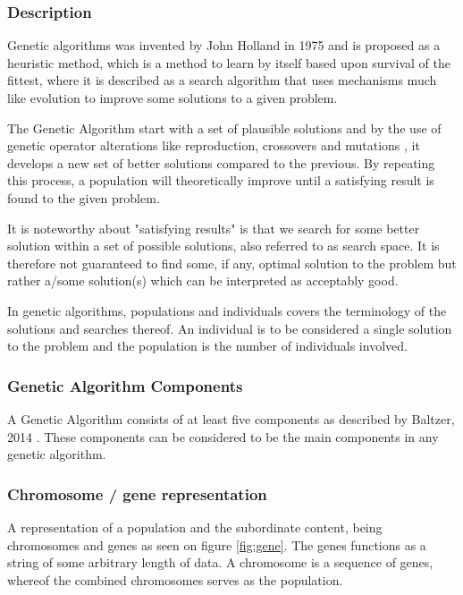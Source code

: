 \subsubsection{Description}
Genetic algorithms was invented by John Holland in 1975 and is proposed as a heuristic method, which is a method to learn by itself based upon survival of the fittest, where it is described as a  search algorithm that uses mechanisms much like evolution to improve some solutions to a given problem. \cite[pp. 20]{Sivanandam2008}

The Genetic Algorithm start with a set of plausible solutions and by the use of genetic operator alterations like reproduction, crossovers and mutations \cite{Baltzer2014}, it develops a new set of better solutions compared to the previous. By repeating this process, a population will theoretically improve until a satisfying result is found to the given problem. \cite{BCS2013}

It is noteworthy about "satisfying results" is that we search for some better solution within a set of possible solutions, also referred to as search space. It is therefore not guaranteed to find some, if any, optimal solution to the problem but rather a/some solution(s) which can be interpreted as acceptably good. \cite[pp. 20/21]{Sivanandam2008}


In genetic algorithms, populations and individuals covers the terminology of the solutions and searches thereof. An individual is to be considered a single solution to the problem and the population is the number of individuals involved. \cite[pp. 39]{Sivanandam2008}



\subsubsection{Genetic Algorithm Components}\label{ssub:components}

A Genetic Algorithm consists of at least five components as described by Baltzer, 2014 \cite{Baltzer2014}. These components can be considered to be the main components in any genetic algorithm.


\subsubsection*{Chromosome / gene representation}

A representation of a population and the subordinate content, being chromosomes and genes as seen on figure \ref{fig:gene}.
The genes functions as a string of some arbitrary length of data. A chromosome is a sequence of genes, whereof the combined chromosomes serves as the population. \cite[pp. 41]{Sivanandam2008}

